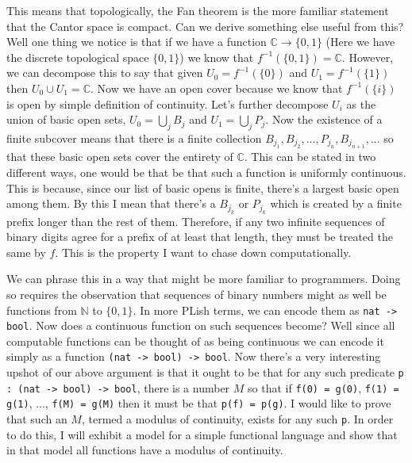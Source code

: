 \documentclass[12pt]{amsart}
\newcommand{\cantor}{\mathbb{C}} %
\begin{document}
This means that topologically, the Fan theorem is the more familiar
statement that the Cantor space is compact. Can we derive something
else useful from this? Well one thing we notice is that if we have a
function $\cantor \to \{0, 1\}$ (Here we have the discrete topological
space $\{0, 1\}$) we know that $f^{-1}(\{0, 1\}) = \cantor$. However,
we can decompose this to say that given $U_0 = f^{-1}(\{0\})$ and
$U_1 = f^{-1}(\{1\})$ then $U_0 \cup U_1 = \cantor$. Now we have an
open cover because we know that $f^{-1}(\{i\})$ is open by simple
definition of continuity. Let's further decompose $U_i$ as the union
of basic open sets, $U_0 = \bigcup_j B_j$ and $U_1 = \bigcup_j P_j$.
Now the existence of a finite subcover means that there is a finite
collection $B_{j_1}, B_{j_2}, ..., P_{j_n}, B_{j_{n + 1}}, ...$ so
that these basic open sets cover the entirety of $\cantor$. This can
be stated in two different ways, one would be that be that such a
function is uniformly continuous. This is because, since our list of
basic opens is finite, there's a largest basic open among them. By
this I mean that there's a $B_{j_k}$ or $P_{j_k}$ which is created by
a finite prefix longer than the rest of them. Therefore, if any two
infinite sequences of binary digits agree for a prefix of at least
that length, they must be treated the same by $f$. This is the
property I want to chase down computationally.

We can phrase this in a way that might be more familiar to
programmers. Doing so requires the observation that sequences of
binary numbers might as well be functions from $\mathbb{N}$ to
$\{0, 1\}$. In more PLish terms, we can encode them as
{\tt nat -> bool}. Now does a continuous function on such sequences
become? Well since all computable functions can be thought of as being
continuous we can encode it simply as a function
{\tt (nat -> bool) -> bool}. Now there's a very interesting upshot
of our above argument is that it ought to be that for any such
predicate {\tt p : (nat -> bool) -> bool}, there is a number $M$ so
that if {\tt f(0) = g(0)}, {\tt f(1) = g(1)}, ..., {\tt f(M) = g(M)}
then it must be that {\tt p(f) = p(g)}. I would like to prove that
such an $M$, termed a modulus of continuity, exists for any such
{\tt p}. In order to do this, I will exhibit a model for a simple
functional language and show that in that model all functions have a
modulus of continuity.
\end{document}
